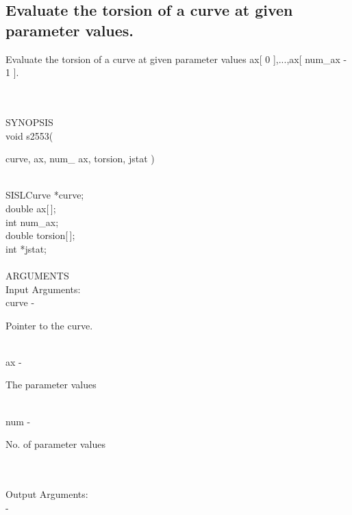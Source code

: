 \subsection{Evaluate the torsion of a curve at given parameter values.}
\begin{minipg1}
Evaluate the torsion of a curve at given parameter values
               ax[ 0 ],...,ax[ num\_ax - 1 ].
\end{minipg1} \\ \\
SYNOPSIS\\
        \> void s2553(\begin{minipg3}
             {\fov curve},  {\fov ax}, num\_ {\fov ax},  {\fov torsion}, jstat )
                \end{minipg3}\\
                \>\>    SISLCurve    \>  *{\fov curve};\\
                \>\>    double    \>  {\fov ax}[\,];\\
                \>\>    int    \>  {\fov num}\_ax;\\
                \>\>    double    \>  {\fov torsion}[\,];\\
                \>\>    int    \>  *{\fov jstat};\\
\\
ARGUMENTS\\
	\>Input Arguments:\\
        \>\>    {\fov curve}\> - \>  \begin{minipg2}
                     Pointer to the curve.
                               \end{minipg2}\\
        \>\>    {\fov ax}\> - \>  \begin{minipg2}
                     The parameter values
                               \end{minipg2}\\
        \>\>    {\fov num}\> - \>  \begin{minipg2}
                     No. of parameter values
                               \end{minipg2}\\
\\
	\>Output Arguments:\\
        \>\>    {\fov }\> - \>  \begin{minipg2}
             
                               \end{minipg2}\\
